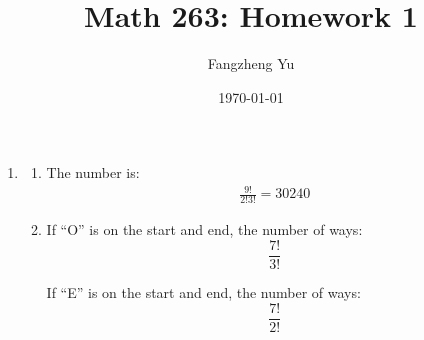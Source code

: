 \documentclass{article}
\title{Math 263: Homework 1}
\author{Fangzheng Yu}
\date{\today}
\begin{document}
    \maketitle
    \begin{enumerate}
        \item
        \begin{enumerate}
            \item The number is: 
            \begin{align*}
                \frac{9!}{2!3!} = 30240
            \end{align*}
            \item 
            If ``O'' is on the start and end, the number of ways:
            \[\frac{7!}{3!}\]
            
            If ``E'' is on the start and end, the number of ways:
            \[\frac{7!}{2!}\]
            

\end{enumerate}
\end{enumerate}
\end{document}
